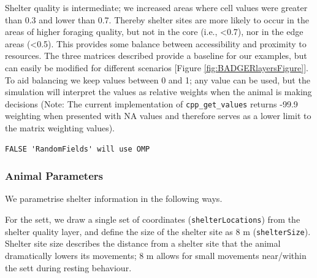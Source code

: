 \documentclass[10pt,a4paper]{article}
\newenvironment{Shaded}{}{}
\newcommand{\AttributeTok}[1]{#1}
\newcommand{\ConstantTok}[1]{#1}
\newcommand{\DecValTok}[1]{#1}
\newcommand{\FloatTok}[1]{#1}
\newcommand{\FunctionTok}[1]{#1}
\newcommand{\NormalTok}[1]{#1}
\newcommand{\OtherTok}[1]{#1}
\newcommand{\SpecialCharTok}[1]{#1}
\newcommand{\StringTok}[1]{#1}
\begin{document}
Shelter quality is intermediate; we increased areas where cell values were greater than 0.3 and lower than 0.7.
Thereby shelter sites are more likely to occur in the areas of higher foraging quality, but not in the core (i.e., \textless0.7), nor in the edge areas (\textless0.5).
This provides some balance between accessibility and proximity to resources.
The three matrices described provide a baseline for our examples, but can easily be modified for different scenarios {[}Figure \ref{fig:BADGERlayersFigure}{]}.
To aid balancing we keep values between 0 and 1; any value can be used, but the simulation will interpret the values as relative weights when the animal is making decisions (Note: The current implementation of \texttt{cpp\_get\_values} returns -99.9 weighting when presented with NA values and therefore serves as a lower limit to the matrix weighting values).

\begin{verbatim}
FALSE 'RandomFields' will use OMP
\end{verbatim}

\hypertarget{animal-parameters}{%
\subsubsection{Animal Parameters}\label{animal-parameters}}

We parametrise shelter information in the following ways.

For the sett, we draw a single set of coordinates (\texttt{shelterLocations}) from the shelter quality layer, and define the size of the shelter site as 8 m (\texttt{shelterSize}).
Shelter site size describes the distance from a shelter site that the animal dramatically lowers its movements; 8 m allows for small movements near/within the sett during resting behaviour.

\begin{Shaded}
\end{Shaded}
\end{document}
